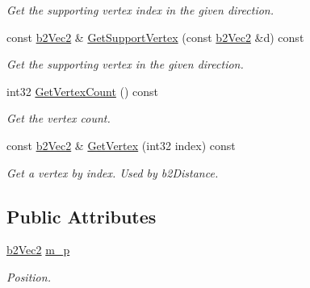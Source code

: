 \begin{DoxyCompactItemize}
\begin{DoxyCompactList}\small\item\em Get the supporting vertex index in the given direction. \end{DoxyCompactList}\item 
\hypertarget{classb2_circle_shape_aa23975b480495bf8bc70073d4f135fd2}{const \hyperlink{structb2_vec2}{b2\-Vec2} \& \hyperlink{classb2_circle_shape_aa23975b480495bf8bc70073d4f135fd2}{Get\-Support\-Vertex} (const \hyperlink{structb2_vec2}{b2\-Vec2} \&d) const }\label{classb2_circle_shape_aa23975b480495bf8bc70073d4f135fd2}

\begin{DoxyCompactList}\small\item\em Get the supporting vertex in the given direction. \end{DoxyCompactList}\item 
\hypertarget{classb2_circle_shape_a477a087b143147223e4b9fbb6581acf1}{int32 \hyperlink{classb2_circle_shape_a477a087b143147223e4b9fbb6581acf1}{Get\-Vertex\-Count} () const }\label{classb2_circle_shape_a477a087b143147223e4b9fbb6581acf1}

\begin{DoxyCompactList}\small\item\em Get the vertex count. \end{DoxyCompactList}\item 
\hypertarget{classb2_circle_shape_a029e555a3ea76b00479b051f1b813c3a}{const \hyperlink{structb2_vec2}{b2\-Vec2} \& \hyperlink{classb2_circle_shape_a029e555a3ea76b00479b051f1b813c3a}{Get\-Vertex} (int32 index) const }\label{classb2_circle_shape_a029e555a3ea76b00479b051f1b813c3a}

\begin{DoxyCompactList}\small\item\em Get a vertex by index. Used by b2\-Distance. \end{DoxyCompactList}\end{DoxyCompactItemize}
\subsection*{Public Attributes}
\begin{DoxyCompactItemize}
\item 
\hypertarget{classb2_circle_shape_a190705618b2e65f636f1dc03c63640ff}{\hyperlink{structb2_vec2}{b2\-Vec2} \hyperlink{classb2_circle_shape_a190705618b2e65f636f1dc03c63640ff}{m\-\_\-p}}\label{classb2_circle_shape_a190705618b2e65f636f1dc03c63640ff}

\begin{DoxyCompactList}\small\item\em Position. \end{DoxyCompactList}\end{DoxyCompactItemize}


